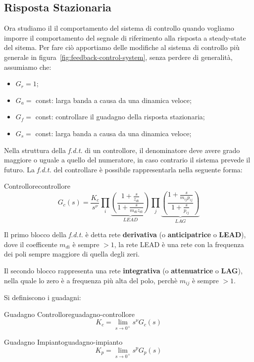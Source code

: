 \documentclass[12pt]{article}
\begin{document}
\subsection{Risposta Stazionaria}
Ora studiamo il il comportamento del sistema di controllo quando vogliamo imporre il comportamento del segnale di riferimento alla risposta a steady-state del sitema. Per fare ci\`o apportiamo delle modifiche al sistema di controllo pi\`u generale in figura~\autoref{fig:feedback-control-system}, senza perdere di generalit\`a, assumiamo che:
\begin{itemize}
    \item $G_r = 1$;
    \item $G_a =$ const: larga banda a causa da una dinamica veloce;
    \item $G_f =$ const: controllare il guadagno della risposta stazionaria;
    \item $G_s = $ const: larga banda a causa da una dinamica veloce;
\end{itemize}

Nella struttura della \emph{f.d.t.} di un controllore, il denominatore deve avere grado maggiore o uguale a quello del numeratore, in caso contrario il sistema prevede il futuro. La \emph{f.d.t.} del controllare \`e possibile rappresentarla nella seguente forma:
\begin{definition}{Controllore}{controllore}
\[ G_c (s) = \frac{K_c}{s^{\nu}} \prod_{i}^{}   \underbrace{\left( \frac{1 + \frac{s}{z _{di}} }{1 + \frac{s}{m _{di} z _{di}} }   \right)}_{LEAD} \prod_{j}^{}   \underbrace{\left( \frac{ 1 + \frac{s}{m _{ij} p _{ij}} }{ 1 + \frac{s}{p _{ij}} }  \right)}_{LAG} \]
\end{definition}

Il primo blocco della \emph{f.d.t.} \`e detta rete \textbf{derivativa} (o \textbf{anticipatrice} o \textbf{LEAD}), dove il coefficente $m _{di}$ \`e sempre $> 1$, la rete LEAD \`e una rete con la frequenza dei poli sempre maggiore di quella degli zeri.

Il secondo blocco rappresenta una rete \textbf{integrativa} (o \textbf{attenuatrice} o \textbf{LAG}), nella quale lo zero \`e a frequenza pi\`u alta del polo, perch\`e $m _{ij}$ \`e sempre $> 1$.

Si definiscono i guadagni:
\begin{definition}{Guadagno Controllore}{guadagno-controllore}
\[ K_c = \lim_{s \to 0^{+}}  s^{\nu} G_c(s) \]
\end{definition}
\begin{definition}{Guadagno Impianto}{guadagno-impianto}
\[ K_p = \lim_{s \to 0^{+}} s^{p}G_p(s)\]
\end{definition}
\end{document}
